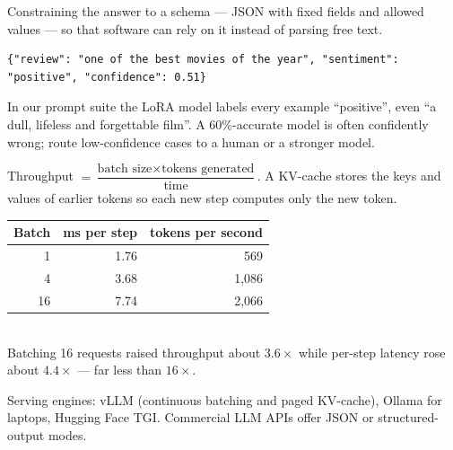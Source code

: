 \documentclass[11pt,a4paper]{article}
\begin{document}
\begin{bdef}
Constraining the answer to a schema --- JSON with fixed fields and allowed values --- so that software can rely on it instead of parsing free text.
\end{bdef}
\begin{bcode}
\begin{lstlisting}
{"review": "one of the best movies of the year", "sentiment": "positive", "confidence": 0.51}
\end{lstlisting}
\end{bcode}
\begin{bwarn}
In our prompt suite the LoRA model labels every example ``positive'', even ``a dull, lifeless and forgettable film''. A 60\%-accurate model is often confidently wrong; route low-confidence cases to a human or a stronger model.
\end{bwarn}
\begin{bmath}
Throughput $=\dfrac{\text{batch size}\times\text{tokens generated}}{\text{time}}$. A KV-cache stores the keys and values of earlier tokens so each new step computes only the new token.
\end{bmath}
\begin{bres}
\begin{tabular}{rrr}
\toprule
Batch & ms per step & tokens per second\\
\midrule
1 & 1.76 & 569\\
4 & 3.68 & 1,086\\
16 & 7.74 & 2,066\\
\bottomrule
\end{tabular}\\[3pt]
Batching 16 requests raised throughput about $3.6\times$ while per-step latency rose about $4.4\times$ --- far less than $16\times$.
\end{bres}
\begin{bapp}
Serving engines: vLLM (continuous batching and paged KV-cache), Ollama for laptops, Hugging Face TGI. Commercial LLM APIs offer JSON or structured-output modes.
\end{bapp}

\end{document}
